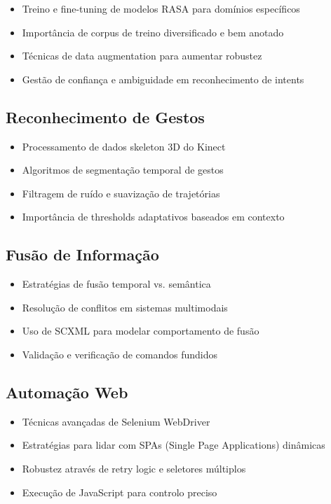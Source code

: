 \begin{itemize}
    \item Treino e fine-tuning de modelos RASA para domínios específicos
    \item Importância de corpus de treino diversificado e bem anotado
    \item Técnicas de data augmentation para aumentar robustez
    \item Gestão de confiança e ambiguidade em reconhecimento de intents
\end{itemize}

\subsection{Reconhecimento de Gestos}

\begin{itemize}
    \item Processamento de dados skeleton 3D do Kinect
    \item Algoritmos de segmentação temporal de gestos
    \item Filtragem de ruído e suavização de trajetórias
    \item Importância de thresholds adaptativos baseados em contexto
\end{itemize}

\subsection{Fusão de Informação}

\begin{itemize}
    \item Estratégias de fusão temporal vs. semântica
    \item Resolução de conflitos em sistemas multimodais
    \item Uso de SCXML para modelar comportamento de fusão
    \item Validação e verificação de comandos fundidos
\end{itemize}

\subsection{Automação Web}

\begin{itemize}
    \item Técnicas avançadas de Selenium WebDriver
    \item Estratégias para lidar com SPAs (Single Page Applications) dinâmicas
    \item Robustez através de retry logic e seletores múltiplos
    \item Execução de JavaScript para controlo preciso
\end{itemize}

